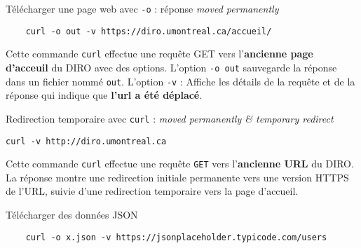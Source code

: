 \documentclass[a4paper]{report}
\begin{document}
    \begin{EExample}{Télécharger une page web avec \texttt{-o} : réponse \emph{moved permanently}}{}
        \begin{lstlisting}
    curl -o out -v https://diro.umontreal.ca/accueil/
        \end{lstlisting}
        Cette commande \texttt{curl} effectue une requête GET vers 
        l'\textbf{ancienne page d'acceuil}   du DIRO avec des options.
        L'option \texttt{-o out} sauvegarde la réponse dans un fichier nommé \texttt{out}.
        L'option \texttt{-v} : Affiche les détails de la requête et de la réponse qui indique 
        que \textbf{l'url a été déplacé}.
        \begin{center}
            \hyperlink{Télécharger une page web avec curl}{
            }
        \end{center}
    \end{EExample}

    \begin{EExample}{Redirection temporaire avec \texttt{curl} : \emph{moved permanently \& temporary redirect}}{}
    \begin{lstlisting}
curl -v http://diro.umontreal.ca
    \end{lstlisting}
    Cette commande \texttt{curl} effectue une requête \texttt{GET}  vers 
    l'\textbf{ancienne URL} du DIRO.  
    La réponse montre une redirection initiale permanente vers une version HTTPS de l'URL, 
    suivie d'une redirection temporaire vers la page d'accueil. 
    \begin{center}
        \hyperlink{Redirection temporaire avec curl}{
        }
    \end{center}
\end{EExample}


    \begin{EExample}{Télécharger des données JSON}{} 
        \begin{lstlisting}
    curl -o x.json -v https://jsonplaceholder.typicode.com/users
        \end{lstlisting}
        \begin{center}
            \hyperlink{Télécharger des données JSON}{
            }
        \end{center}
    \end{EExample}
\end{document}
